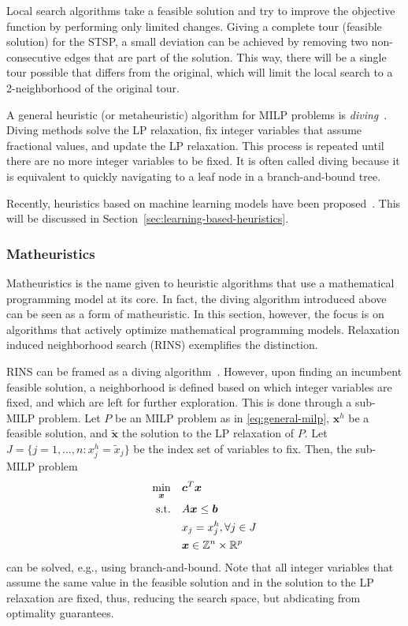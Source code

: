 Local search algorithms take a feasible solution and try to improve the objective function by performing only limited changes.
Giving a complete tour (feasible solution) for the STSP, a small deviation can be achieved by removing two non-consecutive edges that are part of the solution.
This way, there will be a single tour possible that differs from the original, which will limit the local search to a 2-neighborhood of the original tour.

A general heuristic (or metaheuristic) algorithm for MILP problems is \emph{diving}~\cite{fischettiHeuristicsMixedInteger2011}.
Diving methods solve the LP relaxation, fix integer variables that assume fractional values, and update the LP relaxation.
This process is repeated until there are no more integer variables to be fixed.
It is often called diving because it is equivalent to quickly navigating to a leaf node in a branch-and-bound tree.

Recently, heuristics based on machine learning models have been proposed~\cite{bengioMachineLearningCombinatorial2021}.
This will be discussed in Section~\ref{sec:learning-based-heuristics}.

\subsubsection{Matheuristics}

Matheuristics is the name given to heuristic algorithms that use a mathematical programming model at its core.
In fact, the diving algorithm introduced above can be seen as a form of matheuristic.
In this section, however, the focus is on algorithms that actively optimize mathematical programming models.
Relaxation induced neighborhood search (RINS) exemplifies the distinction.

RINS can be framed as a diving algorithm~\cite{maniezzoMatheuristicsAlgorithmsImplementations2021}.
However, upon finding an incumbent feasible solution, a neighborhood is defined based on which integer variables are fixed, and which are left for further exploration.
This is done through a sub-MILP problem.
Let $P$ be an MILP problem as in \eqref{eq:general-milp}, $\bm{x}^{h}$ be a feasible solution, and $\widetilde{\bm{x}}$ the solution to the LP relaxation of $P$.
Let $J = \{j = 1,\ldots,n : x_j^{h} = \widetilde{x}_j\}$ be the index set of variables to fix.
Then, the sub-MILP problem
\begin{align*}
    \min_{\bm{x}} \quad & \bm{c}^{T}\bm{x} \\
    \textrm{s.t.} \quad & A\bm{x}\le \bm{b} \\
      & x_j = x_j^{h}, \forall j \in J \\
      & \bm{x}\in \mathbb{Z}^{n}\times \mathbb{R}^{p}
\end{align*}
can be solved, e.g., using branch-and-bound.
Note that all integer variables that assume the same value in the feasible solution and in the solution to the LP relaxation are fixed, thus, reducing the search space, but abdicating from optimality guarantees.

